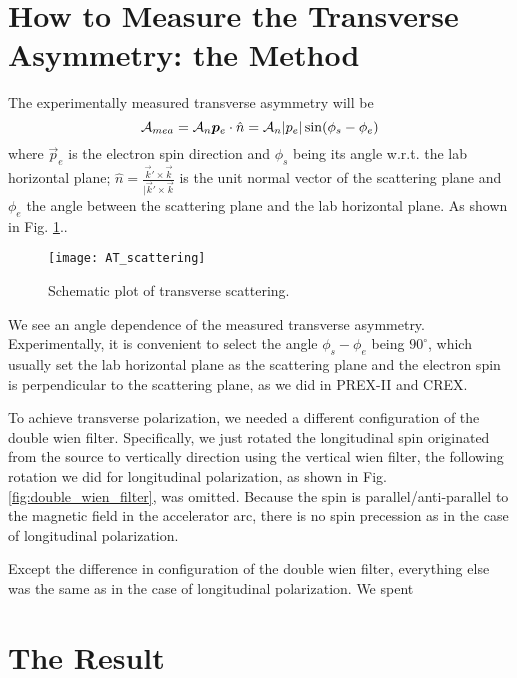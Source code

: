 \section{How to Measure the Transverse Asymmetry: the Method}
The experimentally measured transverse asymmetry will be
\begin{equation}
    \mathcal{A}_{mea} = \mathcal{A}_n \boldsymbol{p}_e \cdot \hat{n} = \mathcal{A}_n |p_e| \sin(\phi_s - \phi_e)
\end{equation}
where $\vec{p}_e$ is the electron spin direction and $\phi_s$ being its angle
w.r.t. the lab horizontal plane; $\hat{n} = \frac{\vec{k}' \times \vec{k}}{|\vec{k}' \times \vec{k}}$ 
is the unit normal vector of the scattering plane and $\phi_e$ the angle between
the scattering plane and the lab horizontal plane. As shown in Fig. \ref{fig:AT_scattering}..
\begin{figure}[h!]
    \centering
    \texttt{[image: AT\_scattering]}
    \caption{Schematic plot of transverse scattering.}
    \label{fig:AT_scattering}
\end{figure}
We see an angle dependence of the measured transverse asymmetry. Experimentally,
it is convenient to select the angle $\phi_s - \phi_e$ being $90^\circ$, which
usually set the lab horizontal plane as the scattering plane and the electron spin
is perpendicular to the scattering plane, as we did in PREX-II and CREX. 

To achieve transverse polarization, we needed a different configuration of the
double wien filter. Specifically, we just rotated the longitudinal spin originated
from the source to vertically direction using the vertical wien filter, the 
following rotation we did for longitudinal polarization, as shown in 
Fig. \ref{fig:double_wien_filter}, was omitted. Because the spin is parallel/anti-parallel
to the magnetic field in the accelerator arc, there is no spin precession as in
the case of longitudinal polarization. 

Except the difference in configuration of the double wien filter, everything 
else was the same as in the case of longitudinal polarization. We spent 

\section{The Result}


